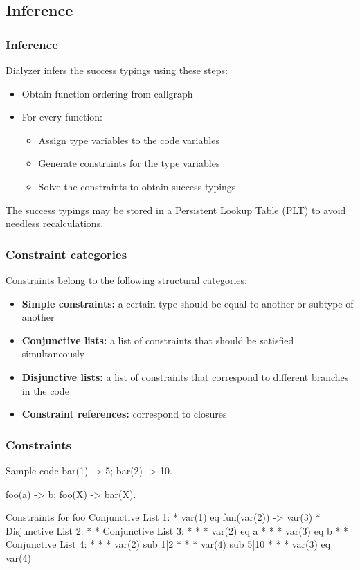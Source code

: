 \documentclass{beamer}
\begin{document}
\subsection{Inference}

\begin{frame}
  \frametitle{Inference}
  Dialyzer infers the success typings using these steps:
  \begin{itemize}
  \item Obtain function ordering from callgraph \pause
  \item For every function:
    \begin{itemize}
    \item Assign type variables to the code variables
    \item Generate constraints for the type variables
    \item Solve the constraints to obtain success typings
    \end{itemize} \pause
  \end{itemize}
  The success typings may be stored in a Persistent Lookup Table (PLT)
  to avoid needless recalculations.
\end{frame}

\begin{frame}
  \frametitle{Constraint categories}
  Constraints belong to the following structural categories: \pause
  \begin{itemize}
  \item \textbf{Simple constraints:} a certain type should be equal to
    another or subtype of another \pause
  \item \textbf{Conjunctive lists:} a list of constraints that should be
    satisfied simultaneously \pause
  \item \textbf{Disjunctive lists:} a list of constraints that
    correspond to different branches in the code \pause
  \item \textbf{Constraint references:} correspond to closures
  \end{itemize}
\end{frame}

\begin{frame}[fragile]
  \frametitle{Constraints}
\begin{code}{Sample code}
bar(1) -> 5;  %
bar(2) -> 10. %

foo(a) -> b;
foo(X) -> bar(X).
\end{code}
\begin{code}{Constraints for foo}
Conjunctive List 1:
 * var(1) eq fun(var(2)) -> var(3)
 * Disjunctive List 2:
 *  * Conjunctive List 3:
 *  *  * var(2) eq a
 *  *  * var(3) eq b
 *  * Conjunctive List 4:
 *  *  * var(2) sub 1|2
 *  *  * var(4) sub 5|10
 *  *  * var(3) eq var(4)
\end{code}
\end{frame}
\end{document}
